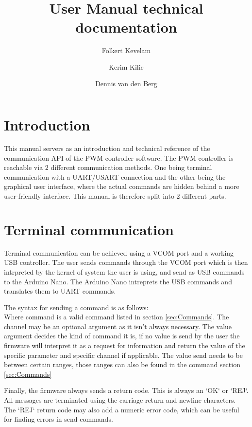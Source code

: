 \documentclass{article}
\title{User Manual technical documentation}
\author{Folkert Kevelam \and Kerim Kilic \and Dennis van den Berg}
\begin{document}
\maketitle
{}
\newpage
\tableofcontents
\newpage


\section{Introduction}
This manual servers as an introduction and technical reference of the communication
API of the PWM controller software. The PWM controller is reachable via 2 different
communication methods. One being terminal communication with a UART/USART connection
and the other being the graphical user interface, where the actual commands are hidden
behind a more user-friendly interface. This manual is therefore split into 2 different
parts.

\section{Terminal communication}
Terminal communication can be achieved using a VCOM port and a working USB controller.
The user sends commands through the VCOM port which is then intrpreted by the kernel
of system the user is using, and send as USB commands to the Arduino Nano. The Arduino Nano
intreprets the USB commands and translates them to UART commands.

The syntax for sending a command is as follows: \\

Where command is a valid command listed in section \ref{sec:Commands}. The channel
may be an optional argument as it isn't always necessary. The value argument
decides the kind of command it is, if no value is send by the user the firmware
will interpret it as a request for information and return the value of the specific
parameter and specific channel if applicable. The value send needs to be between
certain ranges, those ranges can also be found in the command section \ref{sec:Commands}

Finally, the firmware always sends a return code. This is always an `OK` or `REJ`.
All messages are terminated using the carriage return and newline characters.
The `REJ` return code may also add a numeric error code, which can be useful
for finding errors in send commands.
\end{document}
